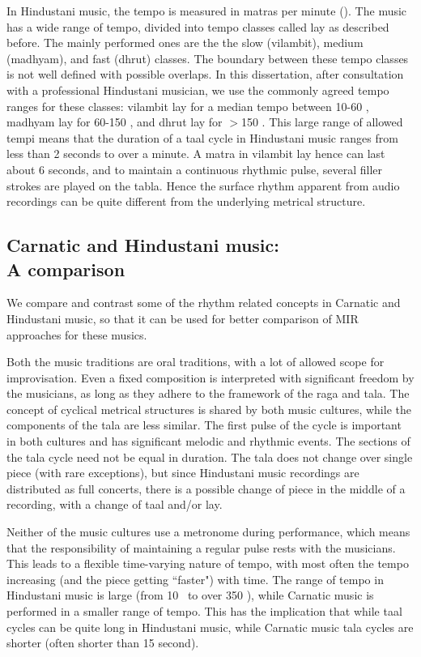 In Hindustani music, the tempo is measured in \glspl{matra} per minute (\mpm). The music has a wide range of tempo, divided into tempo classes called \gls{lay} as described before. The mainly performed ones are the the slow (\gls{vilambit}), medium (\gls{madhyam}), and fast (\gls{dhrut}) classes. The boundary between these tempo classes is not well defined with possible overlaps. In this dissertation, after consultation with a professional Hindustani musician, we use the commonly agreed tempo ranges for these classes: \gls{vilambit} \gls{lay} for a median tempo between 10-60 \mpm, \gls{madhyam} \gls{lay} for 60-150 \mpm, and \gls{dhrut} \gls{lay} for $>$150 \mpm. This large range of allowed tempi means that the duration of a \gls{taal} cycle in Hindustani music ranges from less than 2 seconds to over a minute. A \gls{matra} in \gls{vilambit} \gls{lay} hence can last about 6 seconds, and to maintain a continuous rhythmic pulse, several filler strokes are played on the \gls{tabla}. Hence the surface rhythm apparent from audio recordings can be quite different from the underlying metrical structure.
%
\subsection[Carnatic and Hindustani music: Comparison]{Carnatic and Hindustani music:\\ A comparison}
We compare and contrast some of the rhythm related concepts in Carnatic and Hindustani music, so that it can be used for better comparison of \gls{MIR} approaches for these musics. 

Both the music traditions are oral traditions, with a lot of allowed scope for improvisation. Even a fixed composition is interpreted with significant freedom by the musicians, as long as they adhere to the framework of the \gls{raga} and \gls{tala}. The concept of cyclical metrical structures is shared by both music cultures, while the components of the \gls{tala} are less similar. The first pulse of the cycle is important in both cultures and has significant melodic and rhythmic events. The sections of the \gls{tala} cycle need not be equal in duration. The \gls{tala} does not change over single piece (with rare exceptions), but since Hindustani music recordings are distributed as full concerts, there is a possible change of piece in the middle of a recording, with a change of \gls{taal} and/or \gls{lay}. 

Neither of the music cultures use a metronome during performance, which means that the responsibility of maintaining a regular pulse rests with the musicians. This leads to a flexible time-varying nature of tempo, with most often the tempo increasing (and the piece getting ``faster") with time. The range of tempo in Hindustani music is large (from 10 \mpm\ to over 350 \mpm), while Carnatic music is performed in a smaller range of tempo. This has the implication that while \gls{taal} cycles can be quite long in Hindustani music, while Carnatic music \gls{tala} cycles are shorter (often shorter than 15 second). 

